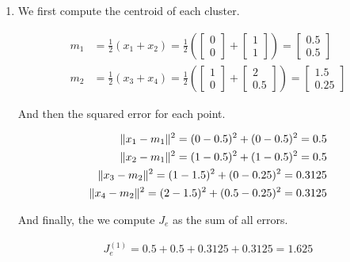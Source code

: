 \documentclass[a4paper, 10pt, twoside]{article}
\begin{document}
\begin{enumerate}
	\item We first compute the centroid of each cluster.

	      \begin{align*}
		      m_1 & =
		      \frac{1}{2} (x_1 + x_2) =
		      \frac{1}{2} \left(
		      \begin{bmatrix} 0 \\ 0 \end{bmatrix} +
		      \begin{bmatrix} 1 \\ 1 \end{bmatrix}
		      \right)                  =
		      \begin{bmatrix} 0.5 \\ 0.5 \end{bmatrix} \\
		      m_2 & =
		      \frac{1}{2} (x_3 + x_4) =
		      \frac{1}{2} \left(
		      \begin{bmatrix} 1 \\ 0 \end{bmatrix} +
		      \begin{bmatrix} 2 \\ 0.5 \end{bmatrix}
		      \right)                 =
		      \begin{bmatrix} 1.5 \\ 0.25 \end{bmatrix}
	      \end{align*}

	      And then the squared error for each point.

	      \begin{align*}
		      \Vert x_1 - m_1 \Vert^2 = (0-0.5)^2 + (0-0.5)^2 = 0.5       \\
		      \Vert x_2 - m_1 \Vert^2 = (1-0.5)^2 + (1-0.5)^2 = 0.5       \\
		      \Vert x_3 - m_2 \Vert^2 = (1-1.5)^2 + (0-0.25)^2 = 0.3125   \\
		      \Vert x_4 - m_2 \Vert^2 = (2-1.5)^2 + (0.5-0.25)^2 = 0.3125 \\
	      \end{align*}

	      And finally, the we compute $J_e$ as the sum of all errors.

	      \begin{align*}
		      J_e^{(1)} = 0.5 + 0.5 + 0.3125 + 0.3125 = 1.625
	      \end{align*}


\end{enumerate}
\end{document}
